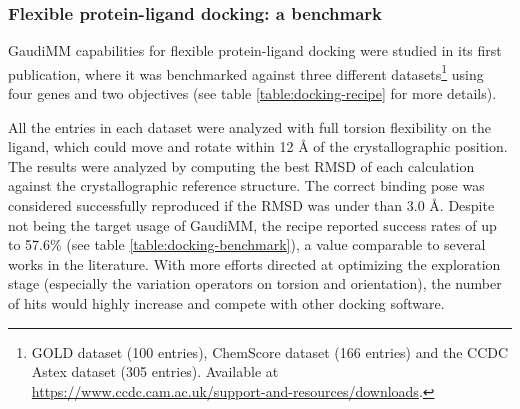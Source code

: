 \subsubsection{Flexible protein-ligand docking: a benchmark}


GaudiMM capabilities for flexible protein-ligand docking were studied in its first publication,\cite{gaudimm} where it was benchmarked against three different datasets\footnote{GOLD dataset (100 entries), ChemScore dataset (166 entries) and the CCDC Astex dataset (305 entries). Available at \url{https://www.ccdc.cam.ac.uk/support-and-resources/downloads}.} using four genes and two objectives (see table \ref{table:docking-recipe} for more details).

All the entries in each dataset were analyzed with full torsion flexibility on the ligand, which could move and rotate within 12 Å of the crystallographic position. The results were analyzed by computing the best RMSD of each calculation against the crystallographic reference structure. The correct binding pose was considered successfully reproduced if the RMSD was under than 3.0 Å. Despite not being the target usage of GaudiMM, the recipe reported success rates of up to 57.6$\%$ (see table \ref{table:docking-benchmark}), a value comparable to several works in the literature.\cite{pagadala2017software} With more efforts directed at optimizing the exploration stage (especially the variation operators on torsion and orientation), the number of hits would highly increase and compete with other docking software.


